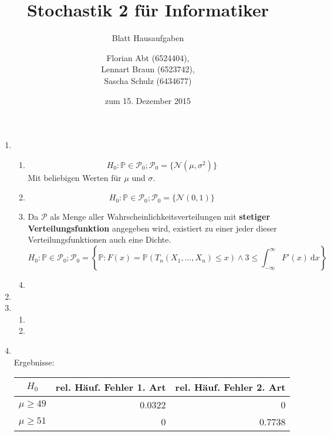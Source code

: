 \documentclass[a4paper]{scrartcl}
\title{Stochastik 2 für Informatiker}
\subtitle{Blatt {\blattnr} Hausaufgaben}
\author{
    Florian Abt (6524404), \\
    Lennart Braun (6523742), \\
    Sascha Schulz (6434677)
}
\date{zum 15. Dezember 2015}
\newcommand{\dif}{\ \mathrm{d}}
\def \blattnr {9}
\begin{document}
\maketitle

\begin{enumerate}[label=\bfseries \blattnr.\arabic*]

    \item 
      \begin{enumerate}
       \item 
        \begin{equation*}
	  H_0: \mathbb{P} \in \mathcal{P}_0; \mathcal{P}_0 = \{ \mathcal{N}(\mu,\sigma^2) \}
	\end{equation*}
	Mit beliebigen Werten für $\mu$ und $\sigma$.
       \item 
	\begin{equation*}
	  H_0: \mathbb{P} \in \mathcal{P}_0; \mathcal{P}_0 = \{ \mathcal{N}(0,1) \}
	\end{equation*}
       \item 
	Da $\mathcal{P}$ als Menge aller Wahrscheinlichkeitsverteilungen mit 
	\textbf{stetiger Verteilungsfunktion} angegeben wird, existiert zu einer 
	jeder dieser Verteilungsfunktionen auch eine Dichte.
	\begin{equation*}
	  H_0: \mathbb{P} \in \mathcal{P}_0; \mathcal{P}_0 = 
	   \left\{ \mathbb{P} : F(x)=\mathbb{P}(T_n(X_1,\ldots,X_n) \leq x) \wedge 3 \leq \int_{-\infty}^{\infty} F'(x) \dif x \right\}
	\end{equation*}
       \item 
      \end{enumerate}

    \item 
    
    \item 
      \begin{enumerate}
       \item 
       \item 
      \end{enumerate}

    \pagebreak
    \item \hfill \\ 
      
      
      \pagebreak
      Ergebnisse:
      
      \begin{tabular}{c|r|r}
       $H_0$ & rel. Häuf. Fehler 1. Art & rel. Häuf. Fehler 2. Art \\
       \hline
       $\mu \geq 49$ & 0.0322 & 0 \\
       $\mu \geq 51$ & 0 & 0.7738
      \end{tabular}
      

\end{enumerate}
\end{document}
